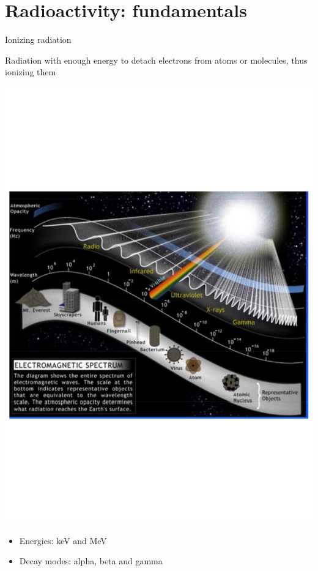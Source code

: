 \section{Radioactivity: fundamentals}

\frame{\tableofcontents[currentsection]}

\begin{frame}{Ionizing radiation}

\alert{Radiation with enough energy to detach electrons from atoms or molecules, thus ionizing them}

\pause
\vskip-2cm
\centering
\includegraphics[scale=0.3]{figures/20160218_rsw_emspectrum.pdf}

\vskip-2cm
\begin{itemize}
\item Energies: keV and MeV
\item Decay modes: alpha, beta and gamma
\end{itemize}

\end{frame}

